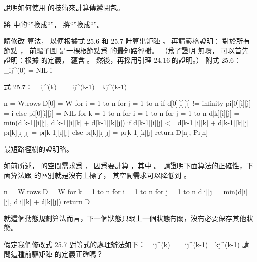 \startEXERCISE
說明如何使用 的技術來計算傳遞閉包。
\stopEXERCISE

\startANSWER
將  中的“\m{\min}”換成“\m{\lor}”，
將“\m{+}”換成“\m{\land}”。
\stopANSWER

\startEXERCISE
請修改  算法，
以便根據式 25.6 和 25.7 計算出矩陣 。
再請嚴格證明：
對於所有節點 ，
前驅子圖  是一棵根節點爲  的最短路徑樹。
（\hint 爲了證明  無環，
可以首先證明：根據  的定義，
  蘊含 。
然後，再採用引理 24.16 的證明。）
附式 25.6：
\startformula
\pi_{ij}^{(0)} = \startcases
\NC NIL \MC {} \NR
\NC i \MC {} \NR
\stopcases
\stopformula

式 25.7：
\startformula
\pi_{ij}^{(k)} = \startcases
\NC \pi_{ij}^{(k-1)} \MC {} \NR
\NC \pi_{kj}^{(k-1)} \MC {} \NR
\stopcases
\stopformula
\stopEXERCISE

\startANSWER
{}
\startCLRS
n = W.rows
D[0] = W
for i = 1 to n
	for j = 1 to n
		if d[0][i][j] != infinity
			pi[0][i][j] = i
		else
			pi[0][i][j] = NIL
for k = 1 to n
	for i = 1 to n
		for j = 1 to n
			d[k][i][j] = min(d[k-1][i][j], d[k-1][i][k] + d[k-1][k][j])
			if d[k-1][i][j] <= d[k-1][i][k] + d[k-1][k][j]
				pi[k][i][j] = pi[k-1][i][j]
			else
				pi[k][i][j] = pi[k-1][k][j]
return D[n], Pi[n]
\stopCLRS

最短路徑樹的證明略。
\stopANSWER

\startEXERCISE
如前所述，  的空間需求爲 ，
因爲要計算 ，其中 。
請證明下面算法的正確性，下面算法跟  的區別就是沒有上標了，
其空間需求可以降低到 。

\startCLRS
n = W.rows
D = W
for k = 1 to n
	for i = 1 to n
		for j = 1 to n
			d[i][j] = min(d[i][j], d[i][k] + d[k][j])
return D
\stopCLRS
\stopEXERCISE

\startANSWER
就這個動態規劃算法而言，下一個狀態只跟上一個狀態有關，沒有必要保存其他狀態。
\stopANSWER

\startEXERCISE
假定我們修改式 25.7 對等式的處理辦法如下：
\startformula
\pi_{ij}^{(k)} = \startcases
\NC \pi_{ij}^{(k-1)} \MC {} \NR
\NC \pi_{kj}^{(k-1)} \MC {} \NR
\stopcases
\stopformula
請問這種前驅矩陣 \m{\prod} 的定義正確嗎？
\stopEXERCISE

